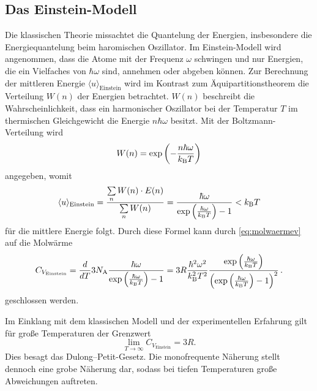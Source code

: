 \subsection{Das Einstein-Modell}
Die klassischen Theorie missachtet die Quantelung der Energien, insbesondere die Energiequantelung beim haromischen Oszillator. 
Im Einstein-Modell wird angenommen, 
dass die Atome mit der Frequenz $\omega$ schwingen und  nur Energien, die ein Vielfaches von $\hbar\omega$ sind, annehmen oder abgeben können.
Zur Berechnung der mittleren Energie $\langle u \rangle _\text{Einstein}$ wird im Kontrast zum Äquipartitionstheorem die Verteilung $W(n)$ der Energien betrachtet. 
$W(n)$ beschreibt die Wahrscheinlichkeit, 
dass ein harmonischer Oszillator 
bei der Temperatur $T$ im thermischen Gleichgewicht die Energie $n\hbar\omega$ besitzt.
Mit der Boltzmann-Verteilung wird
\begin{equation*}
	W(n) = \exp{\left(-\frac{n\hbar \omega}{k_\text B T}\right)}
\end{equation*}
angegeben, womit 
\begin{equation*}
	\langle u \rangle _\text{Einstein} = \frac{\sum\limits_n W(n)\cdot E(n)}{\sum\limits_n W(n)}=	\frac{\hbar\omega}{\exp{\left(\frac{\hbar\omega}{k_\text B T}\right)} - 1}  < k_\text B T
\end{equation*}
für die mittlere Energie folgt.
Durch diese Formel kann durch \eqref{eq:molwaermev} auf die Molwärme
\begin{equation}
	C_{V_\text{Einstein}} = \frac{d}{dT}3 N_\text A \frac{\hbar\omega}{\exp{\left(\frac{\hbar\omega}{k_\text B T}\right)} - 1} = 3R \frac{\hbar^2\omega^2}{k_\text B ^2 T^2} \frac{\exp{\left(\frac{\hbar\omega}{k_\text B T}\right)}}{\left(\exp{\left(\frac{\hbar\omega}{k_\text B T}\right)}-1\right)^2}\,\text.
	\label{eqn:cv}
\end{equation}
geschlossen werden.

Im Einklang mit dem klassischen Modell und der experimentellen Erfahrung gilt für große Temperaturen der Grenzwert
\begin{equation}
	\lim_{T\to\infty} C_{V_\text{Einstein}} = 3R.
\end{equation}
Dies besagt das Dulong--Petit-Gesetz.
Die monofrequente Näherung stellt dennoch eine grobe Näherung dar, 
sodass bei tiefen Temperaturen große Abweichungen auftreten.

